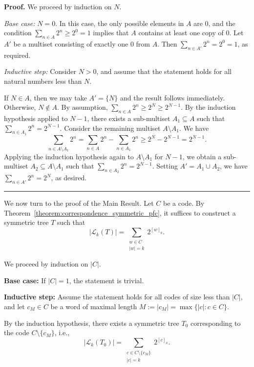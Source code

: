 \documentclass[a4,12pt]{article}%
\newenvironment{proof}[1][Proof]{\textbf{#1.} }{\ \rule{0.5em}{0.5em}}
\begin{document}
\begin{proof}
We proceed by induction on $N$. 

\textit{Base case:} $N = 0$.  
In this case, the only possible elements in $A$ are $0$, and the condition $\sum_{n \in A} 2^n \ge 2^0 = 1$ implies that $A$ contains at least one copy of $0$. Let $A'$ be a multiset consisting of exactly one $0$ from $A$. Then $\sum_{n \in A'} 2^n = 2^0 = 1$, as required.

\textit{Inductive step:} Consider $N > 0$, and assume that the statement holds for all natural numbers less than $N$. 

If $N \in A$, then we may take $A' = \{N\}$ and the result follows immediately. Otherwise, $N \notin A$. By assumption, $\sum_{n \in A} 2^n \ge 2^N \ge 2^{N-1}$. By the induction hypothesis applied to $N-1$, there exists a sub-multiset $A_1 \subseteq A$ such that $\sum_{n \in A_1} 2^n = 2^{N-1}.$ Consider the remaining multiset $A \setminus A_1$. We have 
\[
\sum_{n \in A \setminus A_1} 2^n = \sum_{n \in A} 2^n - \sum_{n \in A_1} 2^n \ge 2^N - 2^{N-1} = 2^{N-1}.
\] 
Applying the induction hypothesis again to $A \setminus A_1$ for $N-1$, we obtain a sub-multiset $A_2 \subseteq A \setminus A_1$ such that $\sum_{n \in A_2} 2^n = 2^{N-1}.$ Setting $A' = A_1 \cup A_2$, we have $\sum_{n \in A'} 2^n = 2^N$, as desired.
\end{proof}

\medskip

We now turn to the proof of the Main Result. Let $C$ be a code. By Theorem~\ref{theorem:correspondence_symmetric_pfc}, it suffices to construct a symmetric tree $T$ such that
\[
|\mathcal{L}_k(T)| = \sum_{\substack{w \in C \\ \lvert w\rvert=k}} 2^{[w]_a}.
\]

\medskip

We proceed by induction on $|C|$. 

\textbf{Base case:} If $|C| = 1$, the statement is trivial.

\medskip

\textbf{Inductive step:} Assume the statement holds for all codes of size less than $|C|$, and let $c_M \in C$ be a word of maximal length $M := \lvert c_M\rvert = \max\{|c| : c \in C\}$.

By the induction hypothesis, there exists a symmetric tree $T_0$ corresponding to the code $C \setminus \{c_M\}$, i.e.,
\[
|\mathcal{L}_k(T_0)| = \sum_{\substack{c \in C \setminus \{c_M\} \\ \lvert c\rvert = k}} 2^{[c]_a}.
\]
\end{document}
